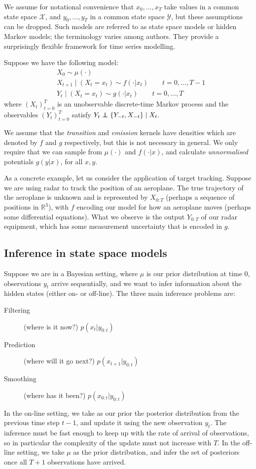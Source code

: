 \documentclass[fleqn]{article}
\theoremstyle{definition}
\newcommand\indep{\protect\mathpalette{\protect\independenT}{\perp}}
\def\independenT#1#2{\mathrel{\rlap{$#1#2$}\mkern2mu{#1#2}}}
\begin{document}
We assume for notational convenience that $x_0,\dots,x_T$ take values in a common state space $\mathcal{X}$, and $y_0,\dots,y_T$ in a common state space $\mathcal{Y}$, but these assumptions can be dropped. 
Such models are referred to as {state space models} or {hidden Markov models}; the terminology varies among authors. They provide a surprisingly flexible framework for time series modelling.

Suppose we have the following model:
\begin{align*}
& X_0 \sim \mu(\cdot) \\
& X_{t+1} \mid (X_t = x_t) \sim f(\cdot | x_t)  \qquad t=0,\dots,T-1 \\
& Y_t \mid (X_t = x_t) \sim g(\cdot | x_t) \qquad t=0,\dots,T
\end{align*}
where $(X_t)_{t=0}^T$ is an unobservable discrete-time Markov process and the observables $(Y_t)_{t=0}^T$ satisfy $Y_t \indep \{Y_{-t}, X_{-t}\} \mid X_t$. 

We assume that the \emph{transition} and \emph{emission} kernels have densities which are denoted by $f$ and $g$ respectively, but this is not necessary in general.
We only require that we can sample from $\mu(\cdot)$ and $f(\cdot | x)$, and calculate \emph{unnormalised} potentials $g(y|x)$, for all $x,y$.

As a concrete example, let us consider the application of target tracking. Suppose we 
are using radar to track the position of an aeroplane. The true trajectory of the aeroplane is unknown and is represented by $X_{0:T}$ (perhaps a sequence of positions in $\mathbb{R}^3$), with $f$ encoding our model for how an aeroplane moves (perhaps some differential equations). What we observe is the output $Y_{0:T}$ of our radar equipment, which has some measurement uncertainty that is encoded in $g$.

\subsection{Inference in state space models}
Suppose we are in a Bayesian setting, where $\mu$ is our prior distribution at time 0, observations $y_t$ arrive sequentially, and we want to infer information about the hidden states (either on- or off-line).
The three main inference problems are:
\begin{description}
\item[Filtering] (where is it now?) $p(x_{t} | y_{0:t})$
\item[Prediction] (where will it go next?) $p(x_{t+1} | y_{0:t})$
\item[Smoothing] (where has it been?) $p(x_{0:t} | y_{0:t})$
\end{description}
In the on-line setting, we take as our prior the posterior distribution from the previous time step $t-1$, and update it using the new observation $y_t$. The inference must be fast enough to keep up with the rate of arrival of observations, so in particular the complexity of the update must not increase with $T$.
In the off-line setting, we take $\mu$ as the prior distribution, and infer the set of posteriors once all $T+1$ observations have arrived.
\end{document}
